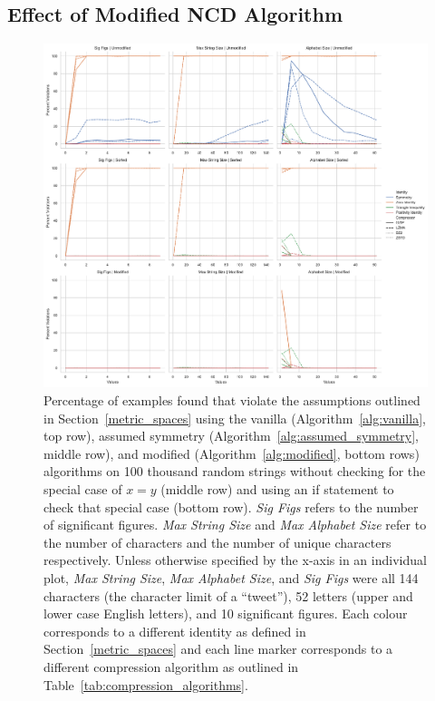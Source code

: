 \documentclass[conference]{IEEEtran}
\begin{document}
\subsection{Effect of Modified NCD Algorithm}

\begin{figure}[htb]
    \centering
    \includegraphics[width=\textwidth]{images/results.pdf}
    \caption{
    Percentage of examples found that violate the assumptions outlined in Section~\ref{metric_spaces} using the vanilla (Algorithm~\ref{alg:vanilla}, top row), assumed symmetry (Algorithm~\ref{alg:assumed_symmetry}, middle row), and modified (Algorithm~\ref{alg:modified}, bottom rows) algorithms on 100 thousand random strings without checking for the special case of $x=y$ (middle row) and using an if statement to check that special case (bottom row). 
    \textit{Sig Figs} refers to the number of significant figures. \textit{Max String Size} and \textit{Max Alphabet Size} refer to the number of characters and the number of unique characters respectively. 
    Unless otherwise specified by the x-axis in an individual plot, \textit{Max String Size}, \textit{Max Alphabet Size}, and \textit{Sig Figs} were all 144 characters (the character limit of a ``tweet''), 52 letters (upper and lower case English letters), and 10 significant figures. Each colour corresponds to a different identity as defined in Section~\ref{metric_spaces} and each line marker corresponds to a different compression algorithm as outlined in Table~\ref{tab:compression_algorithms}.
    }
    \label{fig:mod_assumptions}

\end{figure}
\end{document}
